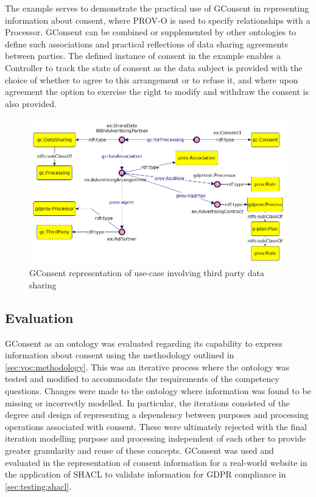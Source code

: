 The example serves to demonstrate the practical use of GConsent in representing information about consent, where PROV-O is used to specify relationships with a Processor. GConsent can be combined or supplemented by other ontologies to define such associations and practical reflections of data sharing agreements between parties. The defined instance of consent in the example enables a Controller to track the state of consent as the data subject is provided with the choice of whether to agree to this arrangement or to refuse it, and where upon agreement the option to exercise the right to modify and withdraw the consent is also provided.
\begin{figure}[htbp]
    \centering
    \includegraphics[width=0.8\linewidth]{img/gconsent_third_party_datasharing.png}
    \caption{GConsent representation of use-case involving third party data sharing \cite{pandit_gconsent_2019}}
    \label{fig:vocabs:gconsent-example}
\end{figure}

\subsection{Evaluation}
GConsent as an ontology was evaluated regarding its capability to express information about consent using the methodology outlined in \autoref{sec:voc:methodology}.
This was an iterative process where the ontology was tested and modified to accommodate the requirements of the competency questions. Changes were made to the ontology where information was found to be missing or incorrectly modelled.
In particular, the iterations consisted of the degree and design of representing a dependency between purposes and processing operations associated with consent. These were ultimately rejected with the final iteration modelling purpose and processing independent of each other to provide greater granularity and reuse of these concepts.
GConsent was used and evaluated in the representation of consent information for a real-world website in the application of SHACL to validate information for GDPR compliance in \autoref{sec:testing:shacl}.

